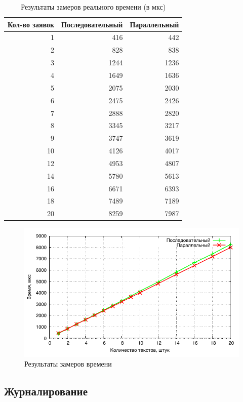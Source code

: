 \begin{table}[h]
  \caption{\label{table:time} Результаты замеров реального времени (в мкс)}
  \begin{center}
    \begin{tabular}{|r|r|r|}
      \hline
      Кол-во заявок & Последовательный & Параллельный \\ \hline 
1 & 416 & 442 \\ \hline 
2 & 828 & 838 \\ \hline 
3 & 1244 & 1236 \\ \hline 
4 & 1649 & 1636 \\ \hline 
5 & 2075 & 2030 \\ \hline 
6 & 2475 & 2426 \\ \hline 
7 & 2888 & 2820 \\ \hline 
8 & 3345 & 3217 \\ \hline 
9 & 3747 & 3619 \\ \hline 
10 & 4126 & 4017 \\ \hline 
12 & 4953 & 4807 \\ \hline 
14 & 5780 & 5613 \\ \hline 
16 & 6671 & 6393 \\ \hline 
18 & 7489 & 7189 \\ \hline 
20 & 8259 & 7987 \\ \hline 
    \end{tabular}
  \end{center}
\end{table}

\noindent
\begin{figure}[h!]
	\centering
    \includegraphics[width=0.7\linewidth]{../data/time}
    \caption{Результаты замеров времени}
    \label{img:time}
\end{figure}

\newpage


\subsection{Журналирование}

